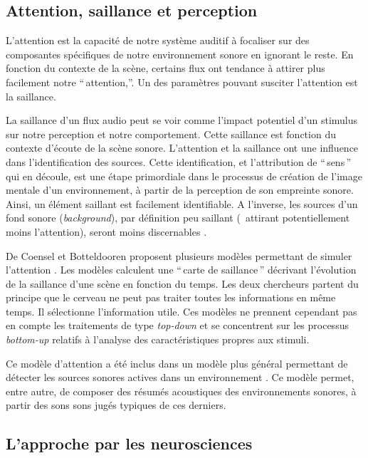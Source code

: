 \subsection{Attention, saillance et perception}

L'attention est la capacité de notre système auditif à focaliser sur des composantes spécifiques de notre environnement sonore en ignorant le reste. En fonction du contexte de la scène, certains flux ont tendance à attirer plus facilement notre ``\,attention,''. Un des paramètres pouvant susciter l’attention est la saillance.

La saillance d’un flux audio peut se voir comme l’impact potentiel d’un stimulus sur notre perception et notre comportement. Cette saillance est fonction du contexte d'écoute de la scène sonore. L’attention et la saillance ont une influence dans l’identification des sources. Cette identification, et l'attribution de ``\,sens\,'' qui en découle, est une étape primordiale dans le processus de création de l’image mentale d’un environnement, à partir de la perception de son empreinte sonore. Ainsi, un élément saillant est facilement identifiable. A l'inverse, les sources d'un fond sonore (\emph{background}), par définition peu saillant (\ie~attirant potentiellement moins l’attention), seront moins discernables \citep{elhilali2009interaction}.

De Coensel et Botteldooren proposent plusieurs modèles permettant de simuler l’attention \citep{botteldooren2009role,de2010model,de2010application}. Les modèles calculent une ``\,carte de saillance\,'' décrivant l’évolution de la saillance d’une scène en fonction du temps. Les deux chercheurs partent du principe que le cerveau ne peut pas traiter toutes les informations en même temps. Il sélectionne l'information utile. Ces modèles ne prennent cependant pas en compte les traitements de type \emph{top-down} et se concentrent sur les processus \emph{bottom-up} relatifs à l’analyse des caractéristiques propres aux stimuli.

Ce modèle d'attention a été inclus dans un modèle plus général permettant de détecter les sources sonores actives dans un environnement \citep{oldoni2012computational,oldoni2013computational}. Ce modèle permet, entre autre, de composer des résumés acoustiques des environnements sonores, à partir des sons sons jugés typiques de ces derniers.

\subsection{L'approche par les neurosciences}

